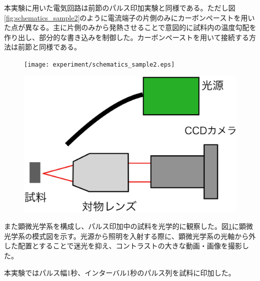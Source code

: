 本実験に用いた電気回路は前節のパルス印加実験と同様である。ただし図\ref{fig:schematics_sample2}のように電流端子の片側のみにカーボンペーストを用いた点が異なる。主に片側のみから発熱させることで意図的に試料内の温度勾配を作り出し、部分的な書き込みを制御した。カーボンペーストを用いて接続する方法は前節と同様である。
\begin{figure}[!h]
 \begin{minipage}{0.5\hsize}
    \begin{center}
   \texttt{[image: experiment/schematics\_sample2.eps]}
  \end{center}
  \caption{}
  \label{fig:schematics_sample2}
   \end{minipage}
 \begin{minipage}{0.5\hsize}
    \begin{center}
   \includegraphics[width=0.8\hsize]{experiment/microscope.eps}
  \end{center}
  \caption{}
  \label{fig:microscope}
   \end{minipage}
\end{figure}

また顕微光学系を構成し、パルス印加中の試料を光学的に観察した。図\ref{fig:microscope}に顕微光学系の模式図を示す。光源から照明を入射する際に、顕微光学系の光軸から外した配置とすることで迷光を抑え、コントラストの大きな動画・画像を撮影した。


本実験ではパルス幅1秒、インターバル1秒のパルス列を試料に印加した。


\clearpage

